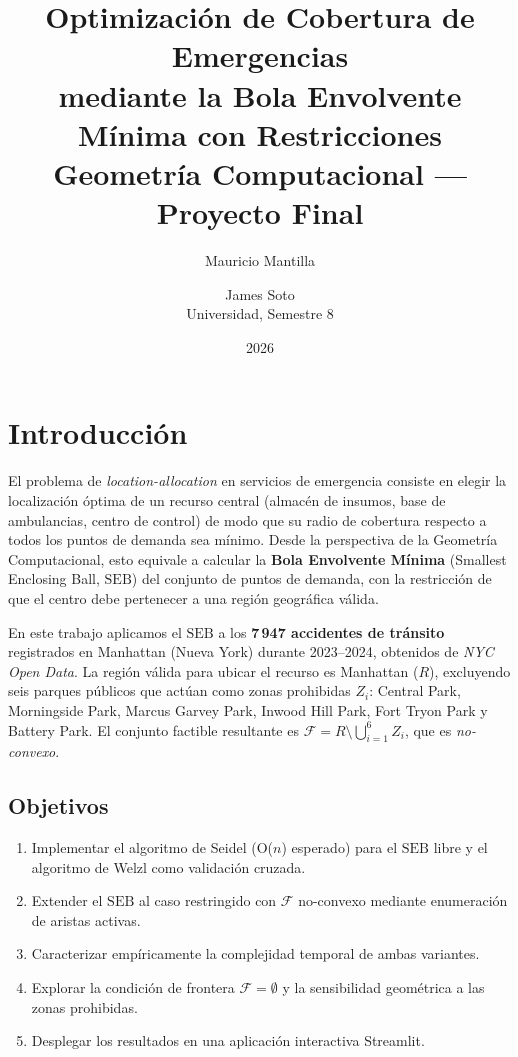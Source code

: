\documentclass[11pt,a4paper]{article}
\title{%
  \textbf{Optimización de Cobertura de Emergencias\\
  mediante la Bola Envolvente Mínima con Restricciones}\\[0.4em]
  \large Geometría Computacional --- Proyecto Final
}
\author{
  Mauricio Mantilla \and James Soto\\[0.3em]
  \normalsize Universidad, Semestre 8
}
\date{2026}
\theoremstyle{definition}
\theoremstyle{remark}
\newcommand{\FF}{\mathcal{F}}
\newcommand{\seb}{\mathrm{SEB}}
\begin{document}
\maketitle
\tableofcontents
\newpage

\section{Introducción}
\label{sec:intro}

El problema de \emph{location-allocation} en servicios de emergencia consiste
en elegir la localización óptima de un recurso central (almacén de insumos,
base de ambulancias, centro de control) de modo que su radio de cobertura
respecto a todos los puntos de demanda sea mínimo.  Desde la perspectiva de la
Geometría Computacional, esto equivale a calcular la \textbf{Bola Envolvente
Mínima} (Smallest Enclosing Ball, $\seb$) del conjunto de puntos de demanda,
con la restricción de que el centro debe pertenecer a una región geográfica
válida.

En este trabajo aplicamos el $\seb$ a los \textbf{7\,947 accidentes de tránsito}
registrados en Manhattan (Nueva York) durante 2023--2024, obtenidos de
\emph{NYC Open Data}.  La región válida para ubicar el recurso es Manhattan
($R$), excluyendo seis parques públicos que actúan como zonas prohibidas
$Z_i$: Central Park, Morningside Park, Marcus Garvey Park, Inwood Hill Park,
Fort Tryon Park y Battery Park.  El conjunto factible resultante es
$\FF = R \setminus \bigcup_{i=1}^6 Z_i$, que es \emph{no-convexo}.

\subsection{Objetivos}

\begin{enumerate}
  \item Implementar el algoritmo de Seidel (O($n$) esperado) para el $\seb$
        libre y el algoritmo de Welzl como validación cruzada.
  \item Extender el $\seb$ al caso restringido con $\FF$ no-convexo mediante
        enumeración de aristas activas.
  \item Caracterizar empíricamente la complejidad temporal de ambas variantes.
  \item Explorar la condición de frontera $\FF = \emptyset$ y la sensibilidad
        geométrica a las zonas prohibidas.
  \item Desplegar los resultados en una aplicación interactiva Streamlit.
\end{enumerate}
\end{document}
